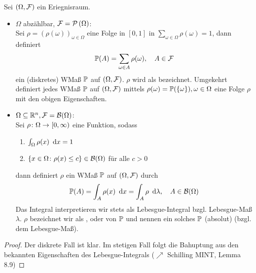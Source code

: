 \begin{satz} \label{satz: 1.8_mass_mit_dichte}
    Sei $(\Omega, \ereignisF)$ ein Eriegnisraum.
    \begin{itemize}[leftmargin=*]
        \item $\Omega$ abzählbar, $\ereignisF = \pows{\Omega}$:  \\
        Sei $\rho = \left( \rho(\omega) \right)_{\omega \in \Omega}$ eine Folge in $[0,1]$ in $\sum_{\omega \in \Omega} \rho(\omega) = 1$, dann definiert
        \begin{equation*}
        \P(A) = \sum_{\omega \in A} \rho(\omega), \quad A \in \ereignisF
        \end{equation*}
        ein (diskretes) WMaß $\P$ auf $(\Omega, \ereignisF)$. $\rho$ wird als  bezeichnet.
        Umgekehrt definiert jedes WMaß $\P$ auf $(\Omega, \ereignisF)$ mittels $\rho(\omega) = \P(\set{\omega}), \omega \in \Omega$ eine Folge $\rho$ mit den obigen Eigenschaften.
        \item $\Omega \subseteq \Rn, \ereignisF = \borel{\Omega}$: \\
        Sei $\abb{\rho}{\Omega}{[0, \infty)}$ eine Funktion, sodass
        \begin{enumerate}[nolistsep]
            \item $\int_{\Omega} \rho(x) \dx = 1$
            \item $\set{x \in \Omega \colon \rho(x) \leq c} \in \borel{\Omega}$ für alle $c > 0$ 
        \end{enumerate}
        dann definiert $\rho$ ein WMaß $\P$ auf $(\Omega, \ereignisF)$ durch 
        \begin{equation*}
            \P(A) = \int_{A} \rho(x) \dx = \int_{A} \rho \diff{\lambda}, \quad A \in \borel{\Omega}
        \end{equation*}
        Das Integral interpretieren wir stets als Lebesgue-Integral bzgl. Lebesgue-Maß $\lambda$.
        $\rho$ bezeichnet wir als ,  oder  von $\P$ und nennen ein solches $\P$ (absolut)  (bzgl. dem Lebesgue-Maß).
    \end{itemize}
\end{satz}

\begin{proof}
    Der diskrete Fall ist klar.
    Im stetigen Fall folgt die Bahuptung aus den bekannten Eigenschaften des Lebesgue-Integrals ($\nearrow$ Schilling MINT, Lemma 8.9)
\end{proof}

